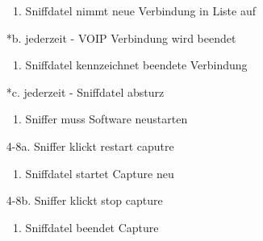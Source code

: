 \documentclass[a4,12pt]{scrartcl}
\begin{document}
\begin{description}
\begin{itemize}
  					\begin{enumerate}
  						\item Sniffdatel nimmt neue Verbindung in Liste auf
					\end{enumerate}
				\item[*b.] jederzeit - VOIP Verbindung wird beendet
  					\begin{enumerate}
  						\item Sniffdatel kennzeichnet beendete Verbindung 
					\end{enumerate}
				\item[*c.]  jederzeit - Sniffdatel absturz
  					\begin{enumerate}
  						\item Sniffer muss Software neustarten
					\end{enumerate}
				\item[4-8a.] Sniffer klickt \grqq restart caputre\grqq 
  					\begin{enumerate}
  						\item Sniffdatel startet Capture neu
					\end{enumerate}
				\item[4-8b.] Sniffer klickt \grqq stop capture\grqq 
  					\begin{enumerate}
  						\item Sniffdatel beendet Capture
					\end{enumerate}
					
			\end{itemize}
\end{description}
\end{document}
